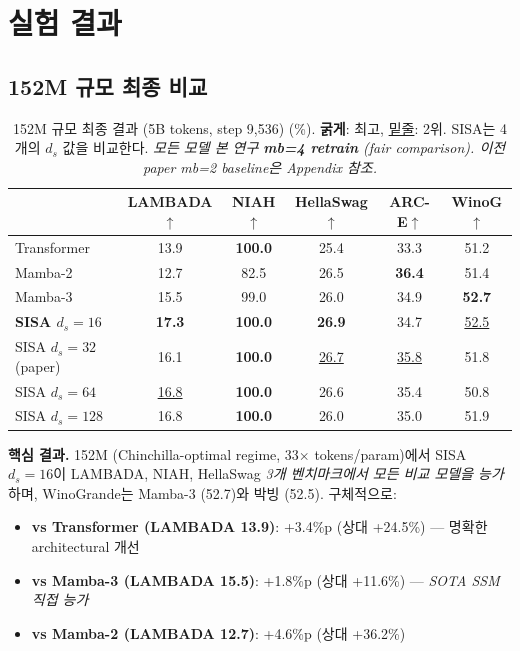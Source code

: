\documentclass[11pt]{article}
\begin{document}
\section{실험 결과}

\subsection{152M 규모 최종 비교}

\begin{table}[h]
\centering
\caption{152M 규모 최종 결과 (5B tokens, step 9,536) (\%). \textbf{굵게}: 최고, \underline{밑줄}: 2위. SISA는 4개의 $d_s$ 값을 비교한다. \textit{모든 모델 본 연구 \textbf{mb=4 retrain} (fair comparison). 이전 paper mb=2 baseline은 Appendix 참조.}}
\label{tab:main}
\begin{tabular}{lccccc}
\toprule
& \textbf{LAMBADA}$\uparrow$ & \textbf{NIAH}$\uparrow$ & \textbf{HellaSwag}$\uparrow$ & \textbf{ARC-E}$\uparrow$ & \textbf{WinoG}$\uparrow$ \\
\midrule
Transformer & 13.9 & \textbf{100.0} & 25.4 & 33.3 & 51.2 \\
Mamba-2 & 12.7 & 82.5 & 26.5 & \textbf{36.4} & 51.4 \\
Mamba-3 & 15.5 & 99.0 & 26.0 & 34.9 & \textbf{52.7} \\
\midrule
\textbf{SISA $d_s = 16$} & \textbf{17.3} & \textbf{100.0} & \textbf{26.9} & 34.7 & \underline{52.5} \\
SISA $d_s = 32$ (paper) & 16.1 & \textbf{100.0} & \underline{26.7} & \underline{35.8} & 51.8 \\
SISA $d_s = 64$ & \underline{16.8} & \textbf{100.0} & 26.6 & 35.4 & 50.8 \\
SISA $d_s = 128$ & 16.8 & \textbf{100.0} & 26.0 & 35.0 & 51.9 \\
\bottomrule
\end{tabular}
\end{table}

\textbf{핵심 결과.} 152M (Chinchilla-optimal regime, 33$\times$ tokens/param)에서 SISA $d_s = 16$이 LAMBADA, NIAH, HellaSwag \textit{3개 벤치마크에서 모든 비교 모델을 능가}하며, WinoGrande는 Mamba-3 (52.7)와 박빙 (52.5). 구체적으로:

\begin{itemize}[leftmargin=*]
\item \textbf{vs Transformer (LAMBADA 13.9)}: +3.4\%p (상대 +24.5\%) — 명확한 architectural 개선
\item \textbf{vs Mamba-3 (LAMBADA 15.5)}: +1.8\%p (상대 +11.6\%) — \textit{SOTA SSM 직접 능가}
\item \textbf{vs Mamba-2 (LAMBADA 12.7)}: +4.6\%p (상대 +36.2\%)
\end{itemize}
\end{document}
